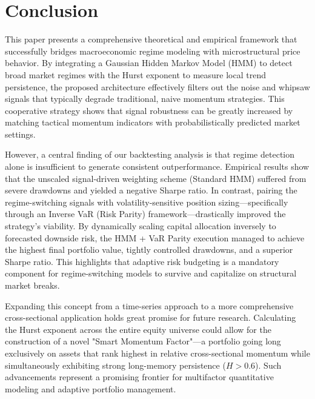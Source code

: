 \documentclass[12pt]{article}
\begin{document}
\section{Conclusion}
This paper presents a comprehensive theoretical and empirical framework that successfully bridges macroeconomic regime modeling with microstructural price behavior. By integrating a Gaussian Hidden Markov Model (HMM) to detect broad market regimes with the Hurst exponent to measure local trend persistence, the proposed architecture effectively filters out the noise and whipsaw signals that typically degrade traditional, naive momentum strategies. This cooperative strategy shows that signal robustness can be greatly increased by matching tactical momentum indicators with probabilistically predicted market settings.

However, a central finding of our backtesting analysis is that regime detection alone is insufficient to generate consistent outperformance. Empirical results show that the unscaled signal-driven weighting scheme (Standard HMM) suffered from severe drawdowns and yielded a negative Sharpe ratio. In contrast, pairing the regime-switching signals with volatility-sensitive position sizing—specifically through an Inverse VaR (Risk Parity) framework—drastically improved the strategy's viability. By dynamically scaling capital allocation inversely to forecasted downside risk, the HMM + VaR Parity execution managed to achieve the highest final portfolio value, tightly controlled drawdowns, and a superior Sharpe ratio. This highlights that adaptive risk budgeting is a mandatory component for regime-switching models to survive and capitalize on structural market breaks.

Expanding this concept from a time-series approach to a more comprehensive cross-sectional application holds great promise for future research. Calculating the Hurst exponent across the entire equity universe could allow for the construction of a novel "Smart Momentum Factor"—a portfolio going long exclusively on assets that rank highest in relative cross-sectional momentum while simultaneously exhibiting strong long-memory persistence ($H > 0.6$). Such advancements represent a promising frontier for multifactor quantitative modeling and adaptive portfolio management.

\printbibliography
\end{document}

